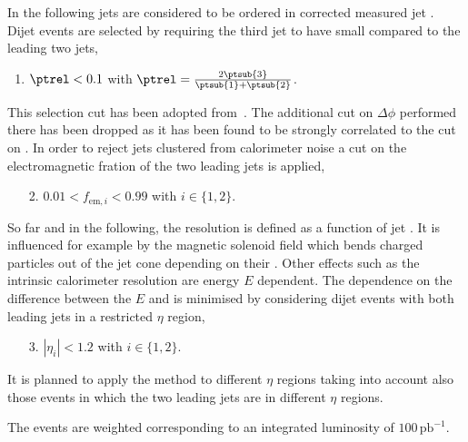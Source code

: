\documentclass[a4paper]{cmspaper} %
\begin{document}
In the following jets are considered to be ordered in corrected
measured jet \pt.
Dijet events are selected by requiring the third jet to have small \pt
compared to the leading two jets,
\begin{enumerate}
\item $\ptrel < 0.1$ with $\ptrel = \frac{2\ptsub{3}}{\ptsub{1} + \ptsub{2}}$.
\end{enumerate}
This selection cut has been adopted from~\cite{CMSAN-2008/031}.
The additional cut on $\Delta\phi$ performed there has been dropped as it has been found to be strongly correlated to the cut on \ptrel.
In order to reject jets clustered from calorimeter noise a cut on the
electromagnetic fration of the two leading jets is applied,
\begin{enumerate}
\item[2.] $0.01 < f_{\text{em},i} < 0.99$ with $i\in\{1,2\}$.
\end{enumerate}

So far and in the following, the resolution is defined as a function
of jet \pt.
It is influenced for example by the magnetic solenoid field which
 bends charged particles out of the jet cone depending on their \pt.
Other effects such as the intrinsic calorimeter resolution are energy $E$
dependent.
The dependence on the difference between the $E$ and \pt is minimised by
considering dijet events with both leading jets in a restricted $\eta$ region,
\begin{enumerate}
\item[3.] $|\eta_{i}| < 1.2$ with $i\in\{1,2\}$.
\end{enumerate}
It is planned to apply the method to different $\eta$ regions taking
into account also those events in which the two leading jets are in
different $\eta$ regions.

The events are weighted corresponding to an integrated
luminosity of $100\,\text{pb}^{-1}$.
\end{document}
